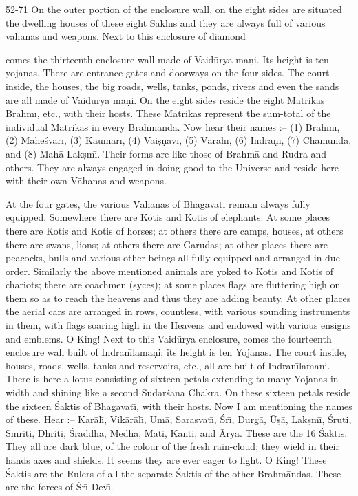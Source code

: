 52-71 On the outer portion of the enclosure wall, on the eight sides are situated the dwelling houses of these eight Sakh\={\i}s and they are always full of various v\=ahanas and weapons. Next to this enclosure of diamond

comes the thirteenth enclosure wall made of Vaid\=urya ma\d{n}i. Its height is ten yojanas. There are entrance gates and doorways on the four sides. The court inside, the houses, the big roads, wells, tanks, ponds, rivers and even the sands are all made of Vaid\=urya ma\d{n}i. On the eight sides reside the eight M\=atrik\=as Br\=ahm\={\i}, etc., with their hosts. These M\=atrik\=as represent the sum-total of the individual M\=atrik\=as in every Brahm\=anda. Now hear their names :-- (1) Br\=ahm\={\i}, (2) M\=ahe\'svar\={\i}, (3) Kaum\=ar\={\i}, (4) Vai\d{s}\d{n}av\={\i}, (5) V\=ar\=ah\={\i}, (6) Indr\=a\d{n}\={\i}, (7) Ch\=amund\=a, and (8) Mah\=a Lak\d{s}m\={\i}. Their forms are like those of Brahm\=a and Rudra and others. They are always engaged in doing good to the Universe and reside here with their own V\=ahanas and weapons.

At the four gates, the various V\=ahanas of Bhagavat\={\i} remain always fully equipped. Somewhere there are Kotis and Kotis of elephants. At some places there are Kotis and Kotis of horses; at others there are camps, houses, at others there are swans, lions; at others there are Garudas; at other places there are peacocks, bulls and various other beings all fully equipped and arranged in due order. Similarly the above mentioned animals are yoked to Kotis and Kotis of chariots; there are coachmen (syces); at some places flags are fluttering high on them so as to reach the heavens and thus they are adding beauty. At other places the aerial cars are arranged in rows, countless, with various sounding instruments in them, with flags soaring high in the Heavens and endowed with various ensigns and emblems. O King! Next to this Vaid\=urya enclosure, comes the fourteenth enclosure wall built of Indran\={\i}lama\d{n}i; its height is ten Yojanas. The court inside, houses, roads, wells, tanks and reservoirs, etc., all are built of Indran\={\i}lama\d{n}i. There is here a lotus consisting of sixteen petals extending to many Yojanas in width and shining like a second Sudar\'sana Chakra. On these sixteen petals reside the sixteen \'Saktis of Bhagavat\={\i}, with their hosts. Now I am mentioning the names of these. Hear :-- Kar\=al\={\i}, Vik\=ar\=al\={\i}, Um\=a, Sarasvat\={\i}, \'Sr\={\i}, Durg\=a, \=U\d{s}\=a, Lak\d{s}m\={\i}, \'Sruti, Smriti, Dhriti, \'Sraddh\=a, Medh\=a, Mati, K\=anti, and \=Ary\=a. These are the 16 \'Saktis. They all are dark blue, of the colour of the fresh rain-cloud; they wield in their hands axes and shields. It seems they are ever eager to fight. O King! These \'Saktis are the Rulers of all the separate \'Saktis of the other Brahm\=andas. These are the forces of \'Sr\={\i} Dev\={\i}.

